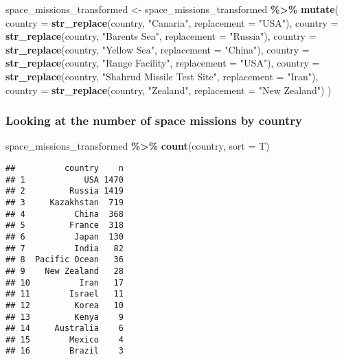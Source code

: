 \documentclass[
]{article}
\newenvironment{Shaded}{\begin{snugshade}}{\end{snugshade}}
\newcommand{\AttributeTok}[1]{\textcolor[rgb]{0.13,0.29,0.53}{#1}}
\newcommand{\FunctionTok}[1]{\textcolor[rgb]{0.13,0.29,0.53}{\textbf{#1}}}
\newcommand{\NormalTok}[1]{#1}
\newcommand{\OtherTok}[1]{\textcolor[rgb]{0.56,0.35,0.01}{#1}}
\newcommand{\SpecialCharTok}[1]{\textcolor[rgb]{0.81,0.36,0.00}{\textbf{#1}}}
\newcommand{\StringTok}[1]{\textcolor[rgb]{0.31,0.60,0.02}{#1}}
\begin{document}
\begin{Shaded}
\begin{Highlighting}[]
\NormalTok{space\_missions\_transformed }\OtherTok{\textless{}{-}}\NormalTok{ space\_missions\_transformed }\SpecialCharTok{\%\textgreater{}\%}
  \FunctionTok{mutate}\NormalTok{(}
    \AttributeTok{country =} \FunctionTok{str\_replace}\NormalTok{(country, }\StringTok{"Canaria"}\NormalTok{, }\AttributeTok{replacement =} \StringTok{"USA"}\NormalTok{),}
    \AttributeTok{country =} \FunctionTok{str\_replace}\NormalTok{(country, }\StringTok{"Barents Sea"}\NormalTok{, }\AttributeTok{replacement =} \StringTok{"Russia"}\NormalTok{),}
    \AttributeTok{country =} \FunctionTok{str\_replace}\NormalTok{(country, }\StringTok{"Yellow Sea"}\NormalTok{, }\AttributeTok{replacement =} \StringTok{"China"}\NormalTok{),}
    \AttributeTok{country =} \FunctionTok{str\_replace}\NormalTok{(country, }\StringTok{"Range Facility"}\NormalTok{, }\AttributeTok{replacement =} \StringTok{"USA"}\NormalTok{),}
    \AttributeTok{country =} \FunctionTok{str\_replace}\NormalTok{(country, }\StringTok{"Shahrud Missile Test Site"}\NormalTok{, }\AttributeTok{replacement =} \StringTok{"Iran"}\NormalTok{),}
    \AttributeTok{country =} \FunctionTok{str\_replace}\NormalTok{(country, }\StringTok{"Zealand"}\NormalTok{, }\AttributeTok{replacement =} \StringTok{"New Zealand"}\NormalTok{)}
\NormalTok{  )}
\end{Highlighting}
\end{Shaded}

\hypertarget{looking-at-the-number-of-space-missions-by-country}{%
\subsubsection{Looking at the number of space missions by
country}\label{looking-at-the-number-of-space-missions-by-country}}

\begin{Shaded}
\begin{Highlighting}[]
\NormalTok{space\_missions\_transformed }\SpecialCharTok{\%\textgreater{}\%} 
  \FunctionTok{count}\NormalTok{(country, }\AttributeTok{sort =}\NormalTok{ T)}
\end{Highlighting}
\end{Shaded}

\begin{verbatim}
##          country    n
## 1            USA 1470
## 2         Russia 1419
## 3     Kazakhstan  719
## 4          China  368
## 5         France  318
## 6          Japan  130
## 7          India   82
## 8  Pacific Ocean   36
## 9    New Zealand   28
## 10          Iran   17
## 11        Israel   11
## 12         Korea   10
## 13         Kenya    9
## 14     Australia    6
## 15        Mexico    4
## 16        Brazil    3
\end{verbatim}
\end{document}

